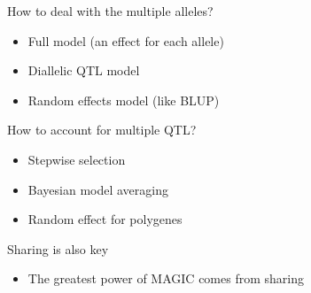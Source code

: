 \documentclass[12pt]{article}
\newcommand{\headsize}{\fontsize{35}{35} \selectfont}
\newcommand{\smallsize}{\fontsize{25}{30} \selectfont}
\newcommand{\smallersize}{\fontsize{20}{25} \selectfont}
\begin{document}
{\vspace{25mm}

\color{mywhite}
\smallsize

\hfill \begin{minipage}{9.5in}
How to deal with the multiple alleles?
\end{minipage}

\vspace{10mm}

\hfill \begin{minipage}{9in}
\color{myblue} \smallersize
\begin{itemize}
\item Full model (an effect for each allele)
\item Diallelic QTL model
\item Random effects model (like BLUP)
\end{itemize}
\end{minipage}

\vspace{20mm}

\color{mywhite}
\smallsize

\hfill \begin{minipage}{9.5in}
How to account for multiple QTL?

\vspace{10mm}

\hfill \begin{minipage}{9in}
\color{myblue} \smallersize
\begin{itemize}
\item Stepwise selection
\item Bayesian model averaging
\item Random effect for polygenes
\end{itemize}
\end{minipage}

\end{minipage}



\newpage


\headsize \color{myyellow}
\hfill \begin{minipage}{5.75in}
\centering
Sharing is also key
\end{minipage}

\vspace{25mm}

\color{mywhite}
\smallsize

 \hfill \begin{minipage}{10in}
 \begin{itemize}
 \itemsep24pt
 \item The greatest power of MAGIC comes from sharing


\end{itemize}
\end{minipage}}
\end{document}
